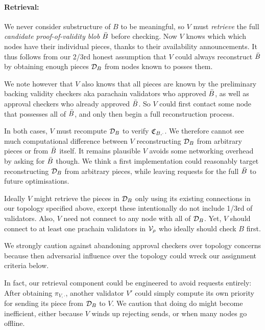 \smallskip
\paragraph{Retrieval:}

We never consider substructure of $B$ to be meaningful, so $V$ must {\em retrieve} the full {\em candidate proof-of-validity blob} $\bar{B}$ before checking.  Now $V$ knows which which nodes have their individual pieces, thanks to their availability announcements.  It thus follows from our 2/3rd honest assumption that $V$ could always reconstruct $\bar{B}$ by obtaining enough pieces $\mathcal{D}_B$ from nodes known to posses them.  

We note however that $V$ also knows that all pieces are known by the preliminary backing validity checkers aka parachain validators who approved $\bar{B}$, as well as approval checkers who already approved $\bar{B}$.  So $V$ could first contact some node that possesses all of $\bar{B}$, and only then begin a full reconstruction process. 

In both cases, $V$ must recompute $\mathcal{D}_B$ to verify $\mathfrak{C}_{B,\cdot}$.  We therefore cannot see much computational difference between $V$ reconstructing $\mathcal{D}_B$ from arbitrary pieces or from $\bar{B}$ itself.  It remains plausible $V$ avoids some networking overhead by asking for $\bar{B}$ though.  We think a first implementation could reasonably target reconstructing $\mathcal{D}_B$ from arbitrary pieces, while leaving requests for the full $\bar{B}$ to future optimisations. 

Ideally $V$ might retrieve the pieces in $\mathcal{D}_B$ only using its existing connections in our topology specified above, except these intentionally do not include 1/3rd of validators.  Also, $V$ need not connect to any node with all of $\mathcal{D}_B$.  Yet, $V$ should connect to at least one prachain validators in $\mathcal{V}_\rho$ who ideally should check $B$ first.  

We strongly caution against abandoning approval checkers over topology concerns because then adversarial influence over the topology could wreck our assignment criteria below.

In fact, our retrieval component could be engineered to avoid requests entirely:  After obtaining $\pi_{V,\cdot}$, another validator $V'$ could simply compute its own priority for sending its piece from $\mathcal{D}_B$ to $V$.  We caution that doing do might become inefficient, either because $V$ winds up rejecting sends, or when many nodes go offline.  


